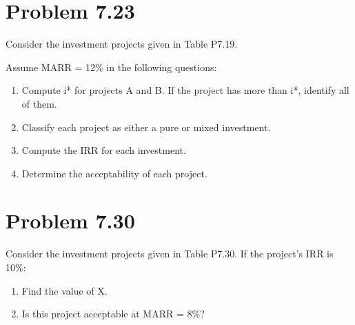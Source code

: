 \documentclass[../INDE250HW.tex]{subfiles}
\begin{document}
\section*{Problem 7.23}
\begin{exmp}
    Consider the investment projects given in Table P7.19.

    Assume MARR = 12\% in the following questions:
    \begin{enumerate}
        \item Compute i* for projects A and B. If the project has more than i*, identify all of them. 
        \item Classify each project as either a pure or mixed investment.
        \item Compute the IRR for each investment.
        \item Determine the acceptability of each project.
    \end{enumerate} 
\end{exmp}


\section*{Problem 7.30}
\begin{exmp}
    Consider the investment projects given in Table P7.30.
    If the project's IRR is 10\%:
    \begin{enumerate}
        \item Find the value of X.
        \item Is this project acceptable at MARR = 8\%?
    \end{enumerate}
\end{exmp}
\end{document}

